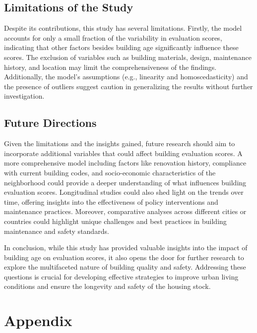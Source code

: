 \documentclass[
  letterpaper,
  DIV=11,
  numbers=noendperiod]{scrartcl}
\begin{document}
\hypertarget{limitations-of-the-study}{%
\subsection{Limitations of the Study}\label{limitations-of-the-study}}

Despite its contributions, this study has several limitations. Firstly,
the model accounts for only a small fraction of the variability in
evaluation scores, indicating that other factors besides building age
significantly influence these scores. The exclusion of variables such as
building materials, design, maintenance history, and location may limit
the comprehensiveness of the findings. Additionally, the model's
assumptions (e.g., linearity and homoscedasticity) and the presence of
outliers suggest caution in generalizing the results without further
investigation.

\hypertarget{future-directions}{%
\subsection{Future Directions}\label{future-directions}}

Given the limitations and the insights gained, future research should
aim to incorporate additional variables that could affect building
evaluation scores. A more comprehensive model including factors like
renovation history, compliance with current building codes, and
socio-economic characteristics of the neighborhood could provide a
deeper understanding of what influences building evaluation scores.
Longitudinal studies could also shed light on the trends over time,
offering insights into the effectiveness of policy interventions and
maintenance practices. Moreover, comparative analyses across different
cities or countries could highlight unique challenges and best practices
in building maintenance and safety standards.

In conclusion, while this study has provided valuable insights into the
impact of building age on evaluation scores, it also opens the door for
further research to explore the multifaceted nature of building quality
and safety. Addressing these questions is crucial for developing
effective strategies to improve urban living conditions and ensure the
longevity and safety of the housing stock.

\hypertarget{appendix}{%
\section{Appendix}\label{appendix}}
\end{document}
